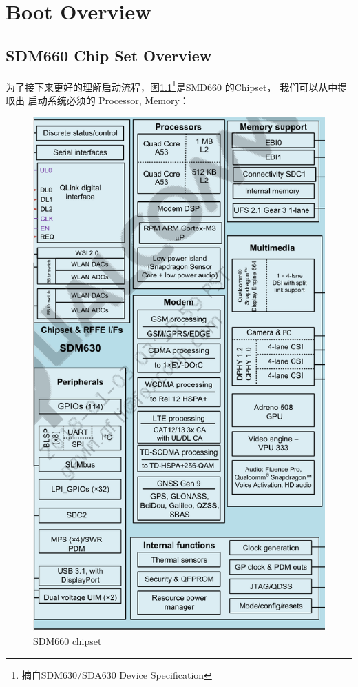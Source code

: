 \chapter{Boot Overview \label{regboot}}


\section {SDM660 Chip Set Overview}

为了接下来更好的理解启动流程，图\ref{chipset}\footnote[1]{摘自SDM630/SDA630 Device Specification}是SMD660 的Chipset， 
我们可以从中提取出 启动系统必须的 Processor, Memory：
\begin{figure}[htbp]
\begin{center}
\includegraphics[width=13cm]{img/sdm660arch}
\caption{SDM660 chipset}
\label{chipset}
\end{center}
\vspace{-0.5em}
\end{figure}

